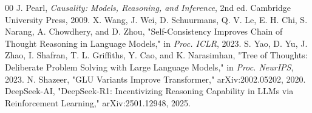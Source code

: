 \documentclass[conference,compsoc]{IEEEtran}
\begin{document}
\begin{thebibliography}{00}
 J. Pearl, \emph{Causality: Models, Reasoning, and Inference}, 2nd ed. Cambridge University Press, 2009.
 X. Wang, J. Wei, D. Schuurmans, Q. V. Le, E. H. Chi, S. Narang, A. Chowdhery, and D. Zhou, "Self-Consistency Improves Chain of Thought Reasoning in Language Models," in \emph{Proc. ICLR}, 2023.
 S. Yao, D. Yu, J. Zhao, I. Shafran, T. L. Griffiths, Y. Cao, and K. Narasimhan, "Tree of Thoughts: Deliberate Problem Solving with Large Language Models," in \emph{Proc. NeurIPS}, 2023.
 N. Shazeer, "GLU Variants Improve Transformer," arXiv:2002.05202, 2020.
 DeepSeek-AI, "DeepSeek-R1: Incentivizing Reasoning Capability in LLMs via Reinforcement Learning," arXiv:2501.12948, 2025.
\end{thebibliography}
\end{document}

